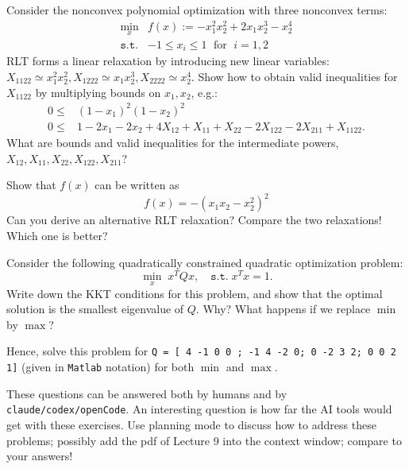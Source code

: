 \documentclass[11pt,fleqn,addpoints]{exam}
\newcommand{\st}{\texttt{s.t.}}
\begin{document}
\begin{questions}
  Consider the nonconvex polynomial optimization with three nonconvex terms:
  \[ \begin{array}{ll} \displaystyle
    \min_x & f(x) := - x_1^2 x_2^2 + 2 x_1 x_2^3 - x_2^4 \\
     \st     & -1 \leq x_i \leq 1 \; \mbox{ for } \; i=1,2
   \end{array}
  \]
  RLT forms a linear relaxation by introducing new linear variables:
  ${X_{1122} \simeq x_1^2 x_2^2}, {X_{1222} \simeq x_1 x_2^3}, {X_{2222} \simeq x_2^4}$.
  Show how to obtain valid inequalities for ${X_{1122}}$ by multiplying bounds on
  $x_1, x_2$, e.g.:
  \[ \begin{array}{ll}
    0 \leq & (1-x_1)^2 (1-x_2)^2  \\
    0 \leq & 1 - 2 x_1 - 2 x_2 + 4 X_{12} + X_{11} + X_{22} - 2 X_{122} - 2 X_{211} + {X_{1122}}.
  \end{array}
  \]
  What are bounds and valid inequalities for the intermediate powers,
  $X_{12}, X_{11}, X_{22}, X_{122}, X_{211}$?
    
  Show that $f(x)$ can be written as
  \[ f(x) =  - \left( {x_1 x_2} - {x_2^2} \right)^2
  \]
  Can you derive an alternative RLT relaxation? Compare the two relaxations!
  Which one is better?

  \question 

  Consider the following quadratically constrained quadratic optimization problem:
  \[ \min_x \; x^T Q x, \quad \st \; x^T x = 1 .\]
  Write down the KKT conditions for this problem, and show that the optimal
  solution is the smallest eigenvalue of $Q$. Why? What happens if we replace
  $\min$ by $\max$?

  Hence, solve this problem for
  {\tt Q = [ 4 -1 0 0 ; -1 4 -2 0; 0 -2 3 2; 0 0 2 1]}
  (given in {\tt Matlab} notation) for both $\min$ and $\max$.
  

  \question

  These questions can be answered both by humans and by {\tt claude/codex/openCode}.
  An interesting question is how far the AI tools would get with these exercises.
  Use planning mode to discuss how to address these problems; possibly add the pdf
  of Lecture 9 into the context window; compare to your answers!


\end{questions}
\end{document}
